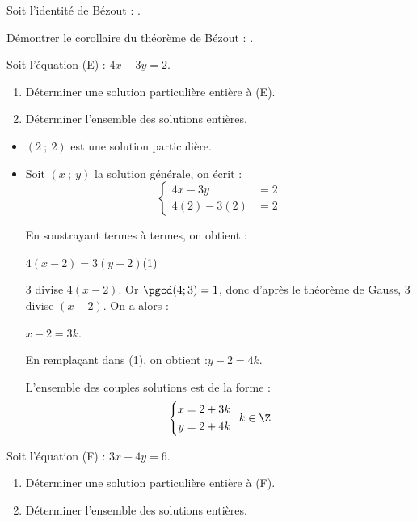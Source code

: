 \documentclass{cornouaille}
\begin{document}
\begin{colonne*exercice}
\begin{exercice}
  Soit l'identité de Bézout : .

  Démontrer le corollaire du théorème de Bézout : .
\end{exercice}

\columnbreak

\begin{exercice*}
\label{exo-eq_diophantienne}
Soit l'équation (E) : $4x-3y = 2$.
\begin{enumerate}
\item Déterminer une solution particulière entière à (E).
\item Déterminer l'ensemble des solutions entières.
\end{enumerate}
\end{exercice*}
\begin{corrige}
  \begin{itemize}
  \item $(2\ ;\ 2)$ est une solution particulière.
  \item Soit $(x\ ;\ y)$ la solution générale, on écrit :
    $$\left\{\begin{aligned}
        4x-3y&=2\\
        4(2)-3(2)&=2\end{aligned}\right.$$
    
En soustrayant termes à termes, on obtient : 

$4(x-2)=3(y-2)$\enskip (1)

3 divise $4(x-2)$. Or $\pgcd(4;3)=1$, donc d'après le théorème de
Gauss, 3 divise $(x-2)$. On a alors :

$x-2=3k$.

En remplaçant dans (1), on obtient :\enskip $y-2=4k$.

L'ensemble des couples solutions est de la forme :
$$\left\{\begin{aligned}
x&=2+3k\\
y&=2+4k\end{aligned}\right.\enskip k\in\Z$$
\end{itemize}
\end{corrige}

\begin{exercice}
Soit l'équation (F) : $3x - 4y = 6$.
\begin{enumerate}
\item Déterminer une solution particulière entière à (F).
\item Déterminer l'ensemble des solutions entières.
\end{enumerate}
\end{exercice}


\end{colonne*exercice}
\end{document}
